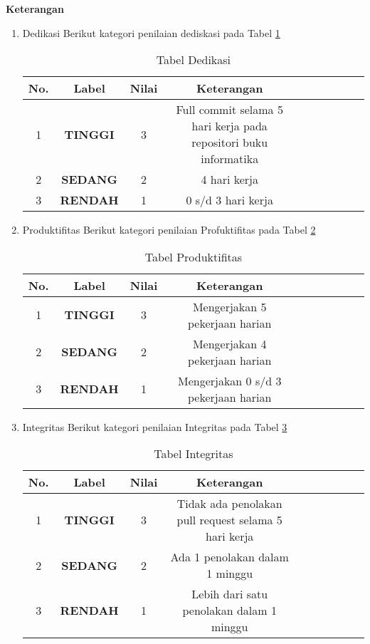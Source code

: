 \textbf{Keterangan}
\begin{enumerate}
\item Dedikasi
Berikut kategori penilaian dediskasi pada Tabel \ref{table:Dedikasi}
\begin{table}[!htbp]
\centering
\begin{tabular}{ |c|c|c|c|c|c|c|c|c|c| }
\hline
No. & Label & Nilai & Keterangan \\
\hline
1 & \textbf{TINGGI} & 3 & Full commit selama 5 hari kerja pada repositori buku informatika \\
\hline
2 & \textbf{SEDANG} & 2 & 4 hari kerja \\
\hline
3 & \textbf{RENDAH} & 1 & 0 s/d 3 hari kerja \\
\hline
\end{tabular}
\caption{Tabel Dedikasi}
\label{table:Dedikasi}
\end{table}

\item Produktifitas
Berikut kategori penilaian Profuktifitas pada Tabel \ref{table:Produktifitas}
\begin{table}[!htbp]
\centering
\begin{tabular}{ |c|c|c|c|c|c|c|c|c|c| }
\hline
No. & Label & Nilai & Keterangan \\
\hline
1 & \textbf{TINGGI} & 3 & Mengerjakan 5 pekerjaan harian \\
\hline
2 & \textbf{SEDANG} & 2 & Mengerjakan 4 pekerjaan harian \\
\hline
3 & \textbf{RENDAH} & 1 & Mengerjakan 0 s/d 3 pekerjaan harian \\
\hline
\end{tabular}
\caption{Tabel Produktifitas}
\label{table:Produktifitas}
\end{table}

\item Integritas
Berikut kategori penilaian Integritas pada Tabel \ref{table:Integritas}
\begin{table}[!htbp]
\centering
\begin{tabular}{ |c|c|c|c|c|c|c|c|c|c| }
\hline
No. & Label & Nilai & Keterangan \\
\hline
1 & \textbf{TINGGI} & 3 & Tidak ada penolakan pull request selama 5 hari kerja \\
\hline
2 & \textbf{SEDANG} & 2 & Ada 1 penolakan dalam 1 minggu \\
\hline
3 & \textbf{RENDAH} & 1 & Lebih dari satu penolakan dalam 1 minggu \\
\hline
\end{tabular}
\caption{Tabel Integritas}
\label{table:Integritas}
\end{table}


\end{enumerate}
